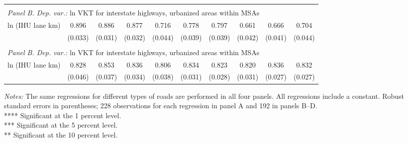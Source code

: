 \begin{table}[htbp]
\begin{tabular}{l*{9}{c}}
 
          \hline         \\         
\multicolumn{9}{l}{ \emph{Panel B. Dep. var.:} ln VKT for interstate highways, urbanized areas within MSAs } \\ 
ln (IHU lane km)    &       0.896\sym{***}&       0.886\sym{***}&       0.877\sym{***}&       0.716\sym{***}&       0.778\sym{***}&       0.797\sym{***}&       0.661\sym{***}&       0.666\sym{***}&       0.704\sym{***}\\
                    &     (0.033)         &     (0.031)         &     (0.032)         &     (0.044)         &     (0.039)         &     (0.039)         &     (0.042)         &     (0.041)         &     (0.044)         \\
 
 
          \hline         \\         
\multicolumn{9}{l}{ \emph{Panel B. Dep. var.:} ln VKT for interstate  highways, urbanized areas within MSAs}  \\ 
ln (IHU lane km)    &       0.828\sym{***}&       0.853\sym{***}&       0.836\sym{***}&       0.806\sym{***}&       0.834\sym{***}&       0.823\sym{***}&       0.820\sym{***}&       0.836\sym{***}&       0.832\sym{***}\\
                    &     (0.046)         &     (0.037)         &     (0.034)         &     (0.038)         &     (0.031)         &     (0.028)         &     (0.031)         &     (0.027)         &     (0.027)         \\
 
\hline\hline
\end{tabular}
\begin{flushleft}
\emph{Notes:} The same regressions for different types of roads are performed in all four panels. All regressions include a constant. Robust standard errors in parentheses; 228 observations for each regression in panel A and 192 in panels B–D. \\         **** Significant at the 1 percent level. \\         *** Significant at the 5 percent level. \\         ** Significant at the 10 percent level.
\end{flushleft}
\end{table}
